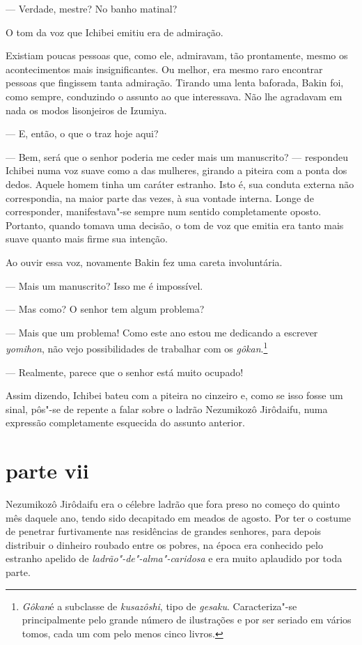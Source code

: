--- Verdade, mestre? No banho matinal?

O tom da voz que Ichibei emitiu era de admiração.

Existiam poucas pessoas que, como ele, admiravam, tão prontamente, mesmo
os acontecimentos mais insignificantes. Ou melhor, era mesmo raro
encontrar pessoas que fingissem tanta admiração. Tirando uma lenta
baforada, Bakin foi, como sempre, conduzindo o assunto ao que interessava.
Não lhe agradavam em nada os modos lisonjeiros de Izumiya.

--- E, então, o que o traz hoje aqui?

--- Bem, será que o senhor poderia me ceder mais um manuscrito? ---
respondeu Ichibei numa voz suave como a das mulheres, girando a piteira
com a ponta dos dedos. Aquele homem tinha um caráter estranho. Isto é,
sua conduta externa não correspondia, na maior parte das vezes, à sua
vontade interna. Longe de corresponder, manifestava"-se sempre num
sentido completamente oposto. Portanto, quando tomava uma decisão, o
tom de voz que emitia era tanto mais suave quanto mais firme sua
intenção.

Ao ouvir essa voz, novamente Bakin fez uma careta involuntária.

--- Mais um manuscrito? Isso me é impossível.

--- Mas como? O senhor tem algum problema?

--- Mais que um problema! Como este ano estou me dedicando a escrever 
\textit{yomihon}, não vejo possibilidades de trabalhar com os
\textit{gôkan}.\footnote{ \textit{Gôkan}é a subclasse de
\textit{kusazôshi}, tipo de \textit{gesaku}. Caracteriza"-se
principalmente pelo grande número de ilustrações e por ser seriado em
vários tomos, cada um com pelo menos cinco livros.}

--- Realmente, parece que o senhor está muito ocupado!

Assim dizendo, Ichibei bateu com a piteira no cinzeiro e, como se isso
fosse um sinal, pôs"-se de repente a falar sobre o ladrão Nezumikozô
Jirôdaifu, numa expressão completamente esquecida do assunto anterior.

\section*{parte vii}

Nezumikozô Jirôdaifu era o célebre ladrão que fora preso no começo do
quinto mês daquele ano, tendo sido decapitado em meados de agosto. Por
ter o costume de penetrar furtivamente nas residências de grandes
senhores, para depois distribuir o dinheiro roubado entre os pobres, na
época era conhecido pelo estranho apelido de \textit{ladrão"-de"-alma"-caridosa}
e era muito aplaudido por toda parte.

